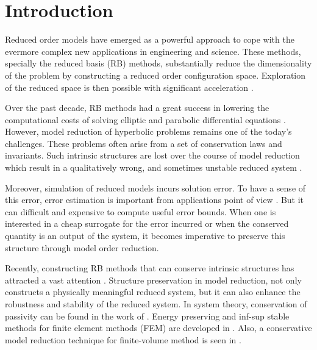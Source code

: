 \section{Introduction}
\label{sec:intro}

Reduced order models have emerged as a powerful approach to cope with the evermore complex new applications in engineering and science. These methods, specially the reduced basis (RB) methods, substantially reduce the dimensionality of the problem by constructing a reduced order configuration space. Exploration of the reduced space is then possible with significant acceleration \cite{hesthaven2015certified,Haasdonk2017}.

Over the past decade, RB methods had a great success in lowering the computational costs of solving elliptic and parabolic differential equations \cite{ito1998reduced,ito2001reduced}. However, model reduction of hyperbolic problems remains one of the today's challenges. These problems often arise from a set of conservation laws and invariants. Such intrinsic structures are lost over the course of model reduction which result in a qualitatively wrong, and sometimes unstable reduced system \cite{Amsallem:2014ef}.

Moreover, simulation of reduced models incurs solution error. To have a sense of this error, error estimation is important from applications point of view \cite{HaasdonkOhlberger11,RuinerEtAl12,BhattEtAl18}. But it can difficult and expensive to compute useful error bounds. When one is interested in a cheap surrogate for the error incurred or when the conserved quantity is an output of the system, it becomes imperative to preserve this structure through model order reduction.

Recently, constructing RB methods that can conserve intrinsic structures has attracted a vast attention \cite{kalashnikova2014stabilization,farhat2015structure,doi:10.1137/110836742,doi:10.1137/140959602,beattie2011structure,doi:10.1137/140978922,doi:10.1137/17M1111991}. Structure preservation in model reduction, not only constructs a physically meaningful reduced system, but it can also enhance the robustness and stability of the reduced system. In system theory, conservation of passivity can be found in the work of \cite{polyuga2010structure,gugercin2012structure}. Energy preserving and inf-sup stable methods for finite element methods (FEM) are developed in \cite{farhat2015structure,ballarin2015supremizer}. Also, a conservative model reduction technique for finite-volume method is seen in \cite{1711.11550}.

